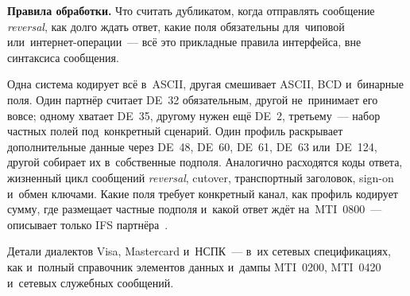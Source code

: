 \textbf{Правила обработки.} Что считать дубликатом, когда отправлять сообщение
\textit{reversal}, как долго ждать ответ, какие поля обязательны для~чиповой
или~интернет-операции~--- всё это прикладные правила интерфейса, вне
синтаксиса сообщения.

Одна система кодирует всё в~ASCII, другая смешивает ASCII, BCD и~бинарные поля.
Один партнёр считает DE~32 обязательным, другой не~принимает его вовсе; одному
хватает DE~35, другому нужен ещё DE~2, третьему~--- набор частных полей
под~конкретный сценарий. Один профиль раскрывает дополнительные данные через
DE~48, DE~60, DE~61, DE~63 или~DE~124, другой собирает их в~собственные
подполя. Аналогично расходятся коды ответа, жизненный цикл сообщений \textit{reversal},
cutover, транспортный заголовок, sign-on и~обмен ключами.
Какие поля требует конкретный канал, как профиль кодирует сумму, где размещает
частные подполя и~какой ответ ждёт на~MTI~0800~--- описывает только IFS
партнёра~\cite{fis-iso8583-guide-2023}.

Детали диалектов Visa, Mastercard и~НСПК~--- в~их сетевых спецификациях, как
и~полный справочник элементов данных и~дампы MTI~0200, MTI~0420 и~сетевых
служебных сообщений.
